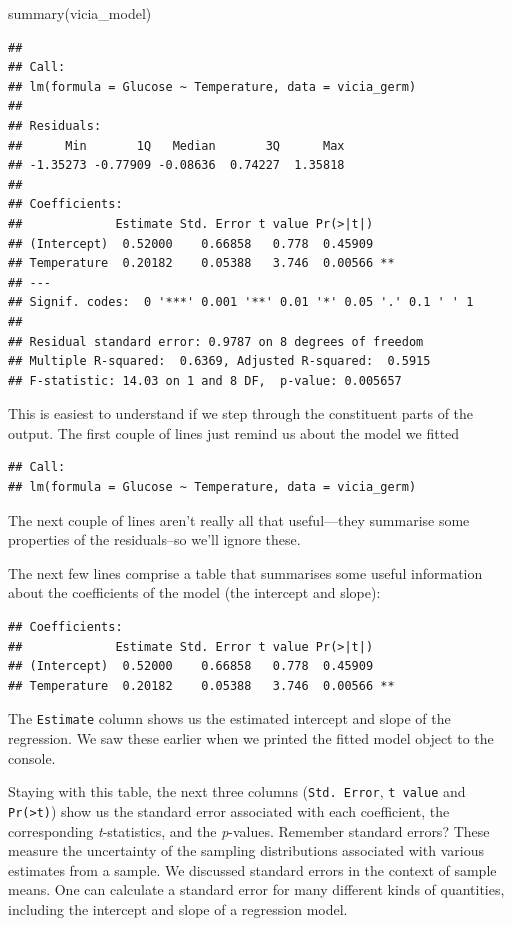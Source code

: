 \documentclass[
]{book}
\newenvironment{Shaded}{\begin{snugshade}}{\end{snugshade}}
\newcommand{\FunctionTok}[1]{\textcolor[rgb]{0.00,0.00,0.00}{#1}}
\newcommand{\NormalTok}[1]{#1}
\begin{document}
\begin{Shaded}
\begin{Highlighting}[]
\FunctionTok{summary}\NormalTok{(vicia\_model)}
\end{Highlighting}
\end{Shaded}

\begin{verbatim}
## 
## Call:
## lm(formula = Glucose ~ Temperature, data = vicia_germ)
## 
## Residuals:
##      Min       1Q   Median       3Q      Max 
## -1.35273 -0.77909 -0.08636  0.74227  1.35818 
## 
## Coefficients:
##             Estimate Std. Error t value Pr(>|t|)   
## (Intercept)  0.52000    0.66858   0.778  0.45909   
## Temperature  0.20182    0.05388   3.746  0.00566 **
## ---
## Signif. codes:  0 '***' 0.001 '**' 0.01 '*' 0.05 '.' 0.1 ' ' 1
## 
## Residual standard error: 0.9787 on 8 degrees of freedom
## Multiple R-squared:  0.6369, Adjusted R-squared:  0.5915 
## F-statistic: 14.03 on 1 and 8 DF,  p-value: 0.005657
\end{verbatim}

This is easiest to understand if we step through the constituent parts of the output. The first couple of lines just remind us about the model we fitted

\begin{verbatim}
## Call: 
## lm(formula = Glucose ~ Temperature, data = vicia_germ)
\end{verbatim}

The next couple of lines aren't really all that useful---they summarise some properties of the residuals--so we'll ignore these.

The next few lines comprise a table that summarises some useful information about the coefficients of the model (the intercept and slope):

\begin{verbatim}
## Coefficients: 
##             Estimate Std. Error t value Pr(>|t|)    
## (Intercept)  0.52000    0.66858   0.778  0.45909    
## Temperature  0.20182    0.05388   3.746  0.00566 **
\end{verbatim}

The \texttt{Estimate} column shows us the estimated intercept and slope of the regression. We saw these earlier when we printed the fitted model object to the console.

Staying with this table, the next three columns (\texttt{Std.\ Error}, \texttt{t\ value} and \texttt{Pr(\textgreater{}\textbar{}t\textbar{})}) show us the standard error associated with each coefficient, the corresponding \emph{t}-statistics, and the \emph{p}-values. Remember standard errors? These measure the uncertainty of the sampling distributions associated with various estimates from a sample. We discussed standard errors in the context of sample means. One can calculate a standard error for many different kinds of quantities, including the intercept and slope of a regression model.
\end{document}
